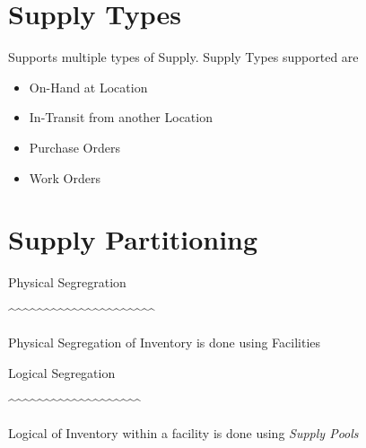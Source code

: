 \documentclass[letterpaper,10pt,english]{sphinxmanual}
\begin{document}
\section{Supply Types}
\label{APS/APS-Features-and-Benefits:supply-types}
Supports multiple types of Supply. Supply Types supported are
\begin{itemize}
\item {} 
On-Hand at Location

\item {} 
In-Transit from another Location

\item {} 
Purchase Orders

\item {} 
Work Orders

\end{itemize}


\section{Supply Partitioning}
\label{APS/APS-Features-and-Benefits:supply-partitioning}
\begin{DUlineblock}{0em}
\item[] Physical Segregration
\item[] \textasciicircum{}\textasciicircum{}\textasciicircum{}\textasciicircum{}\textasciicircum{}\textasciicircum{}\textasciicircum{}\textasciicircum{}\textasciicircum{}\textasciicircum{}\textasciicircum{}\textasciicircum{}\textasciicircum{}\textasciicircum{}\textasciicircum{}\textasciicircum{}\textasciicircum{}\textasciicircum{}\textasciicircum{}\textasciicircum{}\textasciicircum{}
\end{DUlineblock}

Physical Segregation of Inventory is done using Facilities

\begin{DUlineblock}{0em}
\item[] Logical Segregation
\item[] \textasciicircum{}\textasciicircum{}\textasciicircum{}\textasciicircum{}\textasciicircum{}\textasciicircum{}\textasciicircum{}\textasciicircum{}\textasciicircum{}\textasciicircum{}\textasciicircum{}\textasciicircum{}\textasciicircum{}\textasciicircum{}\textasciicircum{}\textasciicircum{}\textasciicircum{}\textasciicircum{}\textasciicircum{}
\end{DUlineblock}

Logical of Inventory within a facility is done using \emph{Supply Pools}
\end{document}
